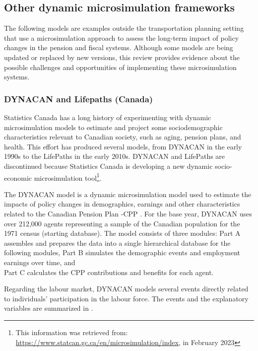 \subsection{Other dynamic microsimulation frameworks} 

The following models are examples outside the transportation planning setting that use a microsimulation approach to assess the long-term impact of policy changes in the pension and fiscal systems. Although some models are being updated or replaced by new versions, this review provides evidence about the possible challenges and opportunities of implementing these microsimulation systems. 

\subsubsection{DYNACAN and Lifepaths (Canada) }

Statistics Canada has a long history of experimenting with dynamic microsimulation models to estimate and project some sociodemographic characteristics relevant to Canadian society, such as aging, pension plans, and health. This effort has produced several models, from DYNACAN in the early 1990s to the LifePaths in the early 2010s. DYNACAN and LifePaths are discontinued because Statistics Canada is developing a new dynamic socio-economic microsimulation tool\footnote{ This information was retrieved from: \url{https://www.statcan.gc.ca/en/microsimulation/index}, in February 2023}. 

The DYNACAN model is a dynamic microsimulation model used to estimate the impacts of policy changes in demographics, earnings and other characteristics related to the Canadian Pension Plan -CPP \citep{StatsCAN2018}. For the base year, DYNACAN uses over 212,000 agents representing a sample of the Canadian population for the 1971 census (starting database). The model consists of three modules: Part A assembles and prepares the data into a single hierarchical database for the following modules, Part B simulates the demographic events and employment earnings over time, and \\ Part C calculates the CPP contributions and benefits for each agent. 

Regarding the labour market, DYNACAN models several events directly related to individuals' participation in the labour force. The events and the explanatory variables are summarized in . 



